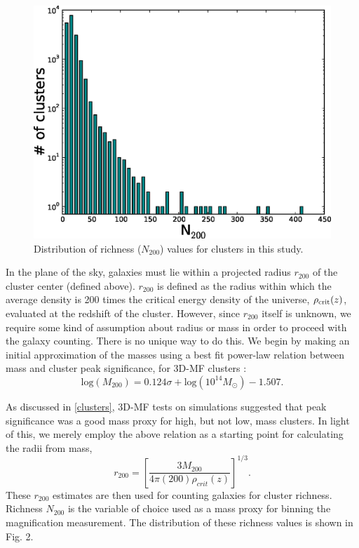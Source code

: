 \begin{figure}
\begin{center}
\includegraphics[scale=0.6]{plots_ch3/N200histogram.eps}
\caption[\ac{3D-MF} Cluster Richness Distribution]{Distribution of richness ($N_{200}$) values for clusters in this study.}
\label{hist}
\end{center}
\end{figure}

In the plane of the sky, galaxies must lie within a projected radius $r_{200}$ of the cluster center (defined above). $r_{200}$ is defined as the radius within which the average density is 200 times the critical energy density of the universe, $\rho_{\rm crit}(z)$, evaluated at the redshift of the cluster. However, since $r_{200}$ itself is unknown, we require some kind of assumption about radius or mass in order to proceed with the galaxy counting. There is no unique way to do this. We begin by making an initial approximation of the masses using a best fit power-law relation between mass and cluster peak significance, for \ac{3D-MF} clusters \citep{MMthesis11}:
\begin{equation}
\mathrm{log}(M_{200}) = 0.124 \sigma + \mathrm{log}(10^{14} M_{\odot}) - 1.507.
\end{equation}

As discussed in \ref{clusters}, \ac{3D-MF} tests on simulations suggested that peak significance was a good mass proxy for high, but not low, mass clusters. In light of this, we merely employ the above relation as a starting point for calculating the radii from mass,
\begin{equation}
r_{200} = \left[ \frac{3 M_{200}}{4 \pi (200) \rho_{crit}(z)} \right] ^ {1/3}.
\end{equation}
These $r_{200}$ estimates are then used for counting galaxies for cluster richness. Richness $N_{200}$ is the variable of choice used as a mass proxy for binning the magnification measurement. The distribution of these richness values is shown in Fig. 2.

